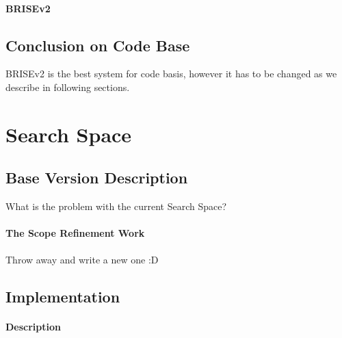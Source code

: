 


\paragraph{BRISEv2}

\subsection{Conclusion on Code Base}\label{impl:hlh code basis conclusion}
BRISEv2 is the best system for code basis, however it has to be changed as we describe in following sections.


\section{Search Space}\label{impl: search space}

\subsection{Base Version Description}
What is the problem with the current Search Space?
\paragraph{The Scope Refinement Work} Throw away and write a new one :D

\subsection{Implementation}
\paragraph{Description}

